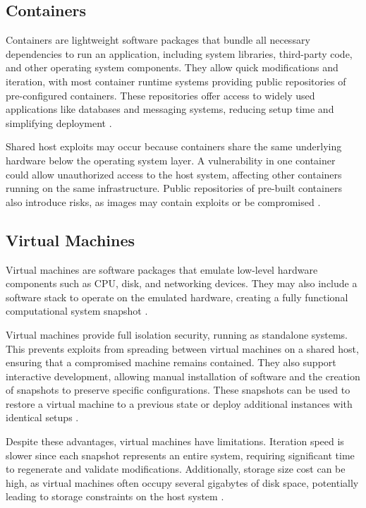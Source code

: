 \subsection{Containers}
Containers are lightweight software packages that bundle all necessary dependencies to run an application, including system libraries, third-party code, and other operating system components. They allow quick modifications and iteration, with most container runtime systems providing public repositories of pre-configured containers. These repositories offer access to widely used applications like databases and messaging systems, reducing setup time and simplifying deployment \cite{atlassian_containers_vs_vms}.

Shared host exploits may occur because containers share the same underlying hardware below the operating system layer. A vulnerability in one container could allow unauthorized access to the host system, affecting other containers running on the same infrastructure. Public repositories of pre-built containers also introduce risks, as images may contain exploits or be compromised \cite{atlassian_containers_vs_vms}.

\subsection{Virtual Machines}
Virtual machines are software packages that emulate low-level hardware components such as CPU, disk, and networking devices. They may also include a software stack to operate on the emulated hardware, creating a fully functional computational system snapshot \cite{atlassian_containers_vs_vms}.

Virtual machines provide full isolation security, running as standalone systems. This prevents exploits from spreading between virtual machines on a shared host, ensuring that a compromised machine remains contained. They also support interactive development, allowing manual installation of software and the creation of snapshots to preserve specific configurations. These snapshots can be used to restore a virtual machine to a previous state or deploy additional instances with identical setups \cite{atlassian_containers_vs_vms}.

Despite these advantages, virtual machines have limitations. Iteration speed is slower since each snapshot represents an entire system, requiring significant time to regenerate and validate modifications. Additionally, storage size cost can be high, as virtual machines often occupy several gigabytes of disk space, potentially leading to storage constraints on the host system \cite{atlassian_containers_vs_vms}.

